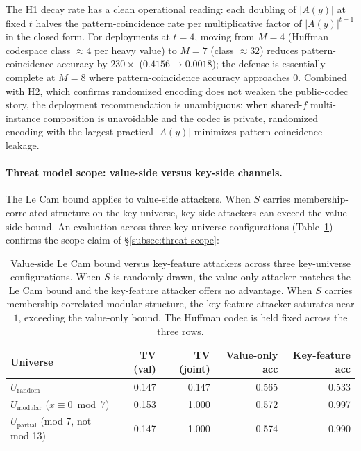 \documentclass[11pt]{article}
\theoremstyle{definition}
\theoremstyle{plain}
\theoremstyle{remark}
\begin{document}
The H1 decay rate has a clean operational reading: each doubling of
$|A(y)|$ at fixed $t$ halves the pattern-coincidence rate per
multiplicative factor of $|A(y)|^{t-1}$ in the closed form.  For
deployments at $t = 4$, moving from $M = 4$ (Huffman codespace
class $\approx 4$ per heavy value) to $M = 7$ (class $\approx 32$)
reduces pattern-coincidence accuracy by $230\times$ ($0.4156 \to
0.0018$); the defense is essentially complete at $M = 8$ where
pattern-coincidence accuracy approaches $0$.  Combined with H2,
which confirms randomized encoding does not weaken the
public-codec story, the deployment recommendation is unambiguous:
when shared-$f$ multi-instance composition is unavoidable and the
codec is private, randomized encoding with the largest practical
$|A(y)|$ minimizes pattern-coincidence leakage.

\paragraph{Threat model scope: value-side versus key-side channels.}
The Le Cam bound applies to value-side attackers.  When $S$ carries
membership-correlated structure on the key universe, key-side
attackers can exceed the value-side bound.  An evaluation across
three key-universe configurations (Table~\ref{tab:scope-keys})
confirms the scope claim of \S\ref{subsec:threat-scope}:

\begin{table}[ht]
\centering
\small
\begin{tabular}{lrrrr}
\toprule
Universe & TV (val) & TV (joint) & Value-only acc & Key-feature acc \\
\midrule
$U_{\mathrm{random}}$  & 0.147 & 0.147 & 0.565 & 0.533 \\
$U_{\mathrm{modular}}$ ($x \equiv 0 \bmod 7$) & 0.153 & 1.000 & 0.572 & 0.997 \\
$U_{\mathrm{partial}}$ (mod 7, not mod 13)    & 0.147 & 1.000 & 0.574 & 0.990 \\
\bottomrule
\end{tabular}
\caption{Value-side Le Cam bound versus key-feature attackers across
three key-universe configurations.  When $S$ is randomly drawn, the
value-only attacker matches the Le Cam bound and the key-feature
attacker offers no advantage.  When $S$ carries membership-correlated
modular structure, the key-feature attacker saturates near $1$,
exceeding the value-only bound.  The Huffman codec is held fixed
across the three rows.}
\label{tab:scope-keys}
\end{table}
\end{document}
